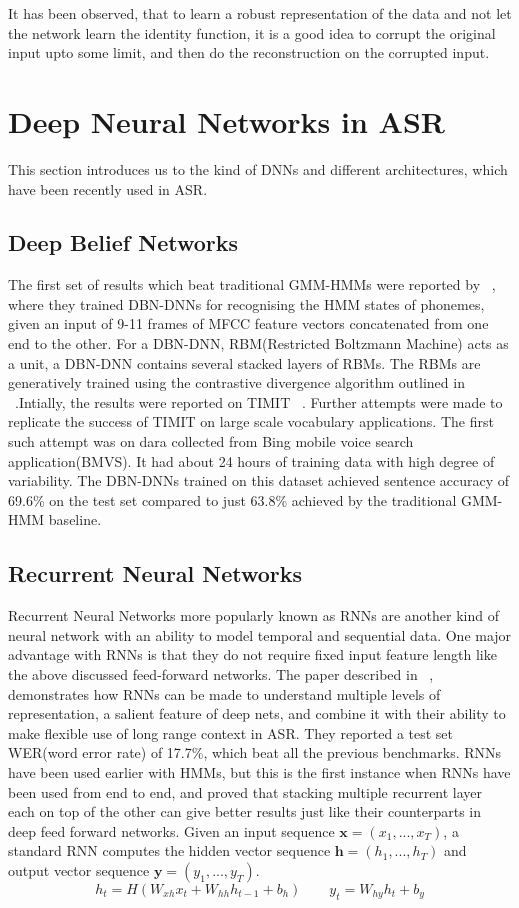 \documentclass[a4paper,11pt]{kth-mag}
\begin{document}
It has been observed, that to learn a robust representation of the data and not let the network learn the identity function, it is a good idea to corrupt the original input upto some limit, and then do the reconstruction on the corrupted input.
\section{Deep Neural Networks in ASR}
This section introduces us to the kind of DNNs and different architectures, which have been recently used in ASR.
\subsection{Deep Belief Networks}
The first set of results which beat traditional GMM-HMMs were reported by ~\cite{mohamed-2009}, where they trained DBN-DNNs for recognising the HMM states of phonemes, given an input of 9-11 frames of MFCC feature vectors concatenated from one end to the other. For a DBN-DNN, RBM(Restricted Boltzmann Machine) acts as a unit, a DBN-DNN contains several stacked layers of RBMs. The RBMs are generatively trained using the contrastive divergence algorithm outlined in ~\cite{mohamed-2009}.Intially, the results were reported on TIMIT ~\cite{timit}. Further attempts were made to replicate the success of TIMIT on large scale vocabulary applications. The first such attempt was on dara collected from Bing mobile voice search application(BMVS). It had about 24 hours of training data with high degree of variability. The DBN-DNNs trained on this dataset achieved sentence accuracy of 69.6\% on the test set compared to just 63.8\% achieved by the traditional GMM-HMM baseline.   
\subsection{Recurrent Neural Networks}
Recurrent Neural Networks more popularly known as RNNs are another kind of neural network with an ability to model temporal and sequential data. One major advantage with RNNs is that they do not require fixed input feature length like the above discussed feed-forward networks. The paper described in ~\cite{graves-2013}, demonstrates how RNNs can be made to understand multiple levels of representation, a salient feature of deep nets, and combine it with their ability to make flexible use of long range context in ASR. They reported a test set WER(word error rate) of 17.7\%, which beat all the previous benchmarks. RNNs have been used earlier with HMMs, but this is the first instance when RNNs have been used from end to end, and proved that stacking multiple recurrent layer each on top of the other can give better results just like their counterparts in deep feed forward networks. Given an input sequence $\textbf{x} = (x_{1}, ..., x_{T})$, a standard RNN computes the hidden vector sequence $\textbf{h} = (h_{1}, ..., h_{T})$ and output vector sequence $\textbf{y} = (y_{1}, ..., y_{T})$. 
\begin{equation}
h_{t} = H(W_{xh}x_{t} + W_{hh}h_{t-1} + b_{h})  \qquad  y_{t} = W_{hy}h_{t} + b_{y}
\end{equation}
\end{document}
